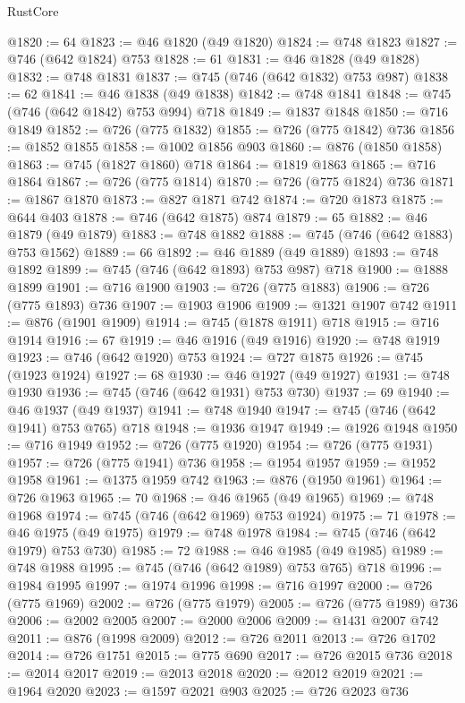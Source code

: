 \begin{lexlean}{RustCore}
\begin{coremodule}
@1820 := 64
@1823 := @46 @1820 (@49 @1820)
@1824 := @748 @1823
@1827 := @746 (@642 @1824) @753
@1828 := 61
@1831 := @46 @1828 (@49 @1828)
@1832 := @748 @1831
@1837 := @745 (@746 (@642 @1832) @753 @987)
@1838 := 62
@1841 := @46 @1838 (@49 @1838)
@1842 := @748 @1841
@1848 := @745 (@746 (@642 @1842) @753 @994) @718
@1849 := @1837 @1848
@1850 := @716 @1849
@1852 := @726 (@775 @1832)
@1855 := @726 (@775 @1842) @736
@1856 := @1852 @1855
@1858 := @1002 @1856 @903
@1860 := @876 (@1850 @1858)
@1863 := @745 (@1827 @1860) @718
@1864 := @1819 @1863
@1865 := @716 @1864
@1867 := @726 (@775 @1814)
@1870 := @726 (@775 @1824) @736
@1871 := @1867 @1870
@1873 := @827 @1871 @742
@1874 := @720 @1873
@1875 := @644 @403
@1878 := @746 (@642 @1875) @874
@1879 := 65
@1882 := @46 @1879 (@49 @1879)
@1883 := @748 @1882
@1888 := @745 (@746 (@642 @1883) @753 @1562)
@1889 := 66
@1892 := @46 @1889 (@49 @1889)
@1893 := @748 @1892
@1899 := @745 (@746 (@642 @1893) @753 @987) @718
@1900 := @1888 @1899
@1901 := @716 @1900
@1903 := @726 (@775 @1883)
@1906 := @726 (@775 @1893) @736
@1907 := @1903 @1906
@1909 := @1321 @1907 @742
@1911 := @876 (@1901 @1909)
@1914 := @745 (@1878 @1911) @718
@1915 := @716 @1914
@1916 := 67
@1919 := @46 @1916 (@49 @1916)
@1920 := @748 @1919
@1923 := @746 (@642 @1920) @753
@1924 := @727 @1875
@1926 := @745 (@1923 @1924)
@1927 := 68
@1930 := @46 @1927 (@49 @1927)
@1931 := @748 @1930
@1936 := @745 (@746 (@642 @1931) @753 @730)
@1937 := 69
@1940 := @46 @1937 (@49 @1937)
@1941 := @748 @1940
@1947 := @745 (@746 (@642 @1941) @753 @765) @718
@1948 := @1936 @1947
@1949 := @1926 @1948
@1950 := @716 @1949
@1952 := @726 (@775 @1920)
@1954 := @726 (@775 @1931)
@1957 := @726 (@775 @1941) @736
@1958 := @1954 @1957
@1959 := @1952 @1958
@1961 := @1375 @1959 @742
@1963 := @876 (@1950 @1961)
@1964 := @726 @1963
@1965 := 70
@1968 := @46 @1965 (@49 @1965)
@1969 := @748 @1968
@1974 := @745 (@746 (@642 @1969) @753 @1924)
@1975 := 71
@1978 := @46 @1975 (@49 @1975)
@1979 := @748 @1978
@1984 := @745 (@746 (@642 @1979) @753 @730)
@1985 := 72
@1988 := @46 @1985 (@49 @1985)
@1989 := @748 @1988
@1995 := @745 (@746 (@642 @1989) @753 @765) @718
@1996 := @1984 @1995
@1997 := @1974 @1996
@1998 := @716 @1997
@2000 := @726 (@775 @1969)
@2002 := @726 (@775 @1979)
@2005 := @726 (@775 @1989) @736
@2006 := @2002 @2005
@2007 := @2000 @2006
@2009 := @1431 @2007 @742
@2011 := @876 (@1998 @2009)
@2012 := @726 @2011
@2013 := @726 @1702
@2014 := @726 @1751
@2015 := @775 @690
@2017 := @726 @2015 @736
@2018 := @2014 @2017
@2019 := @2013 @2018
@2020 := @2012 @2019
@2021 := @1964 @2020
@2023 := @1597 @2021 @903
@2025 := @726 @2023 @736

\end{coremodule}
\end{lexlean}
